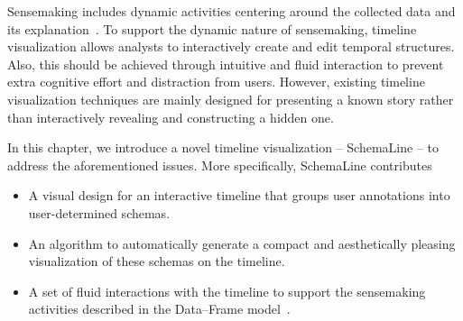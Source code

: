 Sensemaking includes dynamic activities centering around the collected data and its explanation~\cite{Klein2003}. To support the dynamic nature of sensemaking, timeline visualization allows analysts to interactively create and edit temporal structures. Also, this should be achieved through intuitive and fluid interaction to prevent extra cognitive effort and distraction from users. However, existing timeline visualization techniques are mainly designed for presenting a known story rather than interactively revealing and constructing a hidden one.

In this chapter, we introduce a novel timeline visualization -- SchemaLine -- to address the aforementioned issues. More specifically, SchemaLine contributes
\begin{itemize}
	\item A visual design for an interactive timeline that groups user annotations into user-determined schemas.
	\item An algorithm to automatically generate a compact and aesthetically pleasing visualization of these schemas on the timeline.
	\item A set of fluid interactions with the timeline to support the sensemaking activities described in the Data--Frame model~\cite{Klein2003}.
\end{itemize}